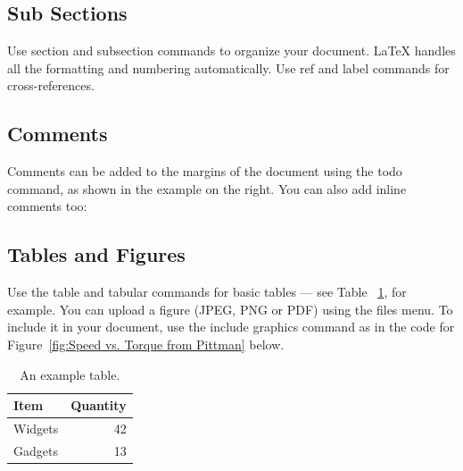 

\subsection{Sub Sections}

Use section and subsection commands to organize your document. \LaTeX{} handles all the formatting and numbering automatically. Use ref and label commands for cross-references.

\subsection{Comments}

Comments can be added to the margins of the document using the  todo command, as shown in the example on the right. You can also add inline comments too:


\subsection{Tables and Figures}

Use the table and tabular commands for basic tables --- see Table~ \ref{tab:widgets}, for example. You can upload a figure (JPEG, PNG or PDF) using the files menu. To include it in your document, use the include graphics command as in the code for Figure~\ref{fig:Speed vs. Torque from Pittman} below.

\begin{table}[h]
\centering
\begin{tabular}{|l|r|}
\hline
Item & Quantity \\\hline
Widgets & 42 \\ \hline
Gadgets & 13 \\ \hline
\end{tabular}
\caption{\label{tab:widgets}An example table.}
\end{table}


